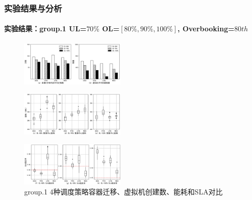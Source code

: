 \begin{frame}
\frametitle{实验结果与分析}
\framesubtitle{实验结果：group.1 \textbf{UL=$70\%$ OL=$[80\%,90\%,100\%]$, Overbooking=$80th$}}
\begin{minipage}{\textwidth}
    \centering
    \begin{figure}[htb]
    \centering
    \includegraphics[width=0.45\textwidth]{figures/fig15_4-4_a.png}
    \end{figure}
\end{minipage}
\begin{minipage}{\textwidth}
    \centering
    \begin{figure}[htb]
    \centering
    \includegraphics[width=0.45\textwidth]{figures/fig15_4-4_b.png}
    \end{figure}
\end{minipage}
\begin{minipage}{\textwidth}
    \centering
    \begin{figure}[htb]
    \centering
    \includegraphics[width=0.45\textwidth]{figures/fig15_4-4_c.png}
    \caption{group.1 4种调度策略容器迁移、虚拟机创建数、能耗和SLA对比}
    \label{fig:fig15}
    \end{figure}
\end{minipage}
\end{frame}

